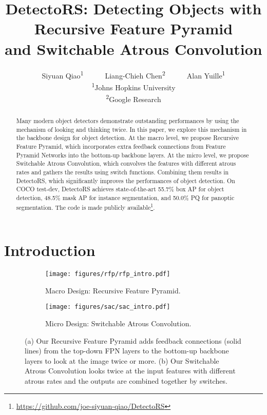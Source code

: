 \documentclass[final]{cvpr}
\begin{document}
\title{DetectoRS: Detecting Objects with Recursive Feature Pyramid\\and Switchable Atrous Convolution}

\author{Siyuan Qiao\textsuperscript{1}~~~~~~Liang-Chieh Chen\textsuperscript{2}~~~~~~Alan Yuille\textsuperscript{1}\\
\textsuperscript{1}Johns Hopkins University\\\textsuperscript{2}Google Research\\
}

\maketitle

\begin{abstract}
Many modern object detectors demonstrate outstanding performances by using the mechanism of looking and thinking twice.
In this paper, we explore this mechanism in the backbone design for object detection.
At the macro level, we propose Recursive Feature Pyramid, which incorporates extra feedback connections from Feature Pyramid Networks into the bottom-up backbone layers.
At the micro level, we propose Switchable Atrous Convolution, which convolves the features with different atrous rates and gathers the results using switch functions.
Combining them results in DetectoRS, which significantly improves the performances of object detection.
On COCO test-dev, DetectoRS achieves state-of-the-art 55.7\% box AP for object detection, 48.5\% mask AP for instance segmentation, and 50.0\% PQ for panoptic segmentation.
The code is made publicly available\footnote{ \url{https://github.com/joe-siyuan-qiao/DetectoRS}}.
\end{abstract} \section{Introduction}

\begin{figure*}[t]
    \centering
    \begin{subfigure}[b]{0.44\textwidth}
         \centering
         \texttt{[image: figures/rfp/rfp\_intro.pdf]}
         \caption{Macro Design: Recursive Feature Pyramid.}
         \label{fig:rfP_intro}
     \end{subfigure}
     \hfill
     \begin{subfigure}[b]{0.55\textwidth}
         \centering
         \texttt{[image: figures/sac/sac\_intro.pdf]}
         \caption{Micro Design: Switchable Atrous Convolution.}
         \label{fig:sac_intro}
     \end{subfigure}
     \caption{(a) Our Recursive Feature Pyramid adds feedback connections (solid lines) from the top-down FPN layers to the bottom-up backbone layers to look at the image twice or more.
     (b) Our Switchable Atrous Convolution looks twice at the input features with different atrous rates and the outputs are combined together by switches.
     }
\end{figure*}
\end{document}
